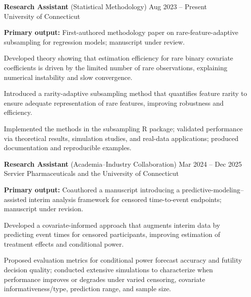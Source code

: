 \documentclass[a4paper,10pt]{article}
\newcommand{\majoritemsep}{\vspace{5pt}}
\newenvironment{reslist}[1][0pt]{%
  \begin{list}{}{%
    \setlength{\leftmargin}{0pt}%
    \setlength{\rightmargin}{0pt}%
    \setlength{\labelwidth}{0pt}%
    \setlength{\labelsep}{0pt}%
    \setlength{\itemindent}{0pt}%
    \setlength{\listparindent}{0pt}%
    \setlength{\itemsep}{#1}%
    \setlength{\topsep}{0pt}%
    \setlength{\parsep}{0pt}%
    \setlength{\partopsep}{0pt}%
  }%
}{\end{list}}
\newenvironment{bulletlist}[1][0pt]{%
  \begin{list}{\textbullet}{%
    \setlength{\leftmargin}{14pt}%
    \setlength{\rightmargin}{0pt}%
    \setlength{\labelwidth}{8pt}%
    \setlength{\labelsep}{6pt}%
    \setlength{\itemindent}{0pt}%
    \setlength{\listparindent}{0pt}%
    \setlength{\itemsep}{#1}%
    \setlength{\topsep}{2pt}%
    \setlength{\parsep}{0pt}%
    \setlength{\partopsep}{0pt}%
  }%
}{\end{list}}
\begin{document}
\begin{reslist}[1pt]

  \item \textbf{Research Assistant} (Statistical Methodology) \hfill Aug 2023 -- Present \\
  University of Connecticut
  \begin{bulletlist}[0pt]
    \item \textbf{Primary output:} First-authored methodology paper on rare-feature-adaptive subsampling for regression models; manuscript under review.
    \item Developed theory showing that estimation efficiency for rare binary covariate coefficients is driven by the limited number of rare observations, explaining numerical instability and slow convergence.
    \item Introduced a rarity-adaptive subsampling method that quantifies feature rarity to ensure adequate representation of rare features, improving robustness and efficiency.
    \item Implemented the methods in the subsampling R package; validated performance via theoretical results, simulation studies, and real-data applications; produced documentation and reproducible examples.
  \end{bulletlist}
  \majoritemsep

  \item \textbf{Research Assistant} (Academia--Industry Collaboration) \hfill Mar 2024 -- Dec 2025 \\
  Servier Pharmaceuticals and the University of Connecticut
  \begin{bulletlist}[0pt]
    \item \textbf{Primary output:} Coauthored a manuscript introducing a predictive-modeling--assisted interim analysis framework for censored time-to-event endpoints; manuscript under revision.
    \item Developed a covariate-informed approach that augments interim data by predicting event times for censored participants, improving estimation of treatment effects and conditional power.
    \item Proposed evaluation metrics for conditional power forecast accuracy and futility decision quality; conducted extensive simulations to characterize when performance improves or degrades under varied censoring, covariate informativeness/type, prediction range, and sample size.
  \end{bulletlist}
  \majoritemsep


\end{reslist}
\end{document}
